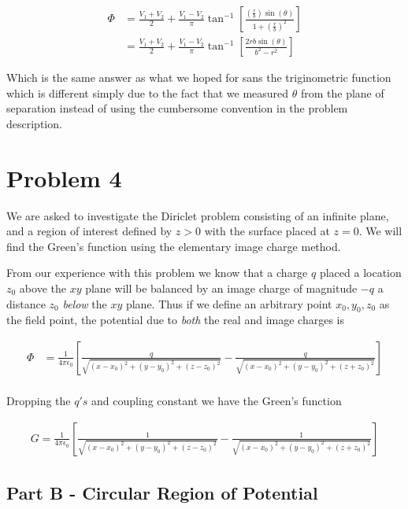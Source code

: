 \documentclass[paper=a4, fontsize=11pt]{scrartcl} %
\numberwithin{equation}{section} %
\numberwithin{figure}{section} %
\numberwithin{table}{section} %
\begin{document}
\begin{align}
\Phi &= \frac{V_1 + V_2}{2} + \frac{V_1 - V_2}{\pi}\tan^{-1}\left[\frac{\left(\frac{r}{b}\right) \sin(\theta)}{1 + \left(\frac{r}{b}\right)^2}\right] \\
&= \frac{V_1 + V_2}{2} + \frac{V_1 - V_2}{\pi}\tan^{-1}\left[\frac{2 r b \sin(\theta)}{b^2 - r^2}\right]
\end{align}

Which is the same answer as what we hoped for sans the triginometric function which is different simply due to the fact that we measured $\theta$ from the plane of separation instead of using the cumbersome convention in the problem description.

\section{Problem 4}

We are asked to investigate the Diriclet problem consisting of an infinite plane, and a region of interest defined by $z > 0$ with the surface placed at $z=0$. We will find the Green's function using the elementary image charge method.

\hspace{2mm}

From our experience with this problem we know that a charge $q$ placed a location $z_0$ above the $xy$ plane will be balanced by an image charge of magnitude $-q$ a distance $z_0$ \textit{below} the $xy$ plane. Thus if we define an arbitrary point $x_0, y_0, z_0$ as the field point, the potential due to \textit{both} the real and image charges is

\begin{align}
\Phi &= \frac{1}{4 \pi \epsilon_0}\left[\frac{q}{\sqrt{(x-x_0)^2 + (y-y_0)^2 + (z - z_0)^2}} - \frac{q}{\sqrt{(x-x_0)^2 + (y-y_0)^2 + (z + z_0)^2}}\right] \\
\end{align}

Dropping the $q's$ and coupling constant we have the Green's function

\begin{align}
G = \frac{1}{4 \pi \epsilon_0}\left[\frac{1}{\sqrt{(x-x_0)^2 + (y-y_0)^2 + (z - z_0)^2}} - \frac{1}{\sqrt{(x-x_0)^2 + (y-y_0)^2 + (z + z_0)^2}} \right]
\end{align}

\subsection{Part B - Circular Region of Potential}
\end{document}
